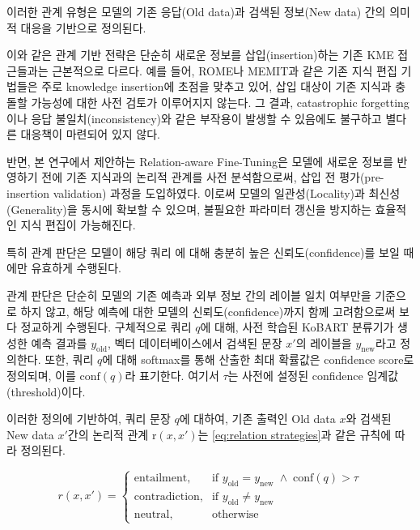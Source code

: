 \documentclass[a4paper,fleqn]{cas-sc}
\begin{document}
이러한 관계 유형은 모델의 기존 응답(Old data)과 검색된 정보(New data) 간의 의미적 대응을 기반으로 정의된다.

이와 같은 관계 기반 전략은 단순히 새로운 정보를 삽입(insertion)하는 기존 KME 접근들과는 근본적으로 다르다. 예를 들어, ROME나 MEMIT과 같은 기존 지식 편집 기법들은 주로 knowledge insertion에 초점을 맞추고 있어, 삽입 대상이 기존 지식과 충돌할 가능성에 대한 사전 검토가 이루어지지 않는다. 그 결과, catastrophic forgetting이나 응답 불일치(inconsistency)와 같은 부작용이 발생할 수 있음에도 불구하고 별다른 대응책이 마련되어 있지 않다.

반면, 본 연구에서 제안하는 Relation-aware Fine-Tuning은 모델에 새로운 정보를 반영하기 전에 기존 지식과의 논리적 관계를 사전 분석함으로써, 삽입 전 평가(pre-insertion validation) 과정을 도입하였다. 이로써 모델의 일관성(Locality)과 최신성(Generality)을 동시에 확보할 수 있으며, 불필요한 파라미터 갱신을 방지하는 효율적인 지식 편집이 가능해진다.

특히 관계 판단은 모델이 해당 쿼리 에 대해 충분히 높은 신뢰도(confidence)를 보일 때에만 유효하게 수행된다.

관계 판단은 단순히 모델의 기존 예측과 외부 정보 간의 레이블 일치 여부만을 기준으로 하지 않고, 해당 예측에 대한 모델의 신뢰도(confidence)까지 함께 고려함으로써 보다 정교하게 수행된다. 
구체적으로 쿼리 \( q \)에 대해, 사전 학습된 KoBART 분류기가 생성한 예측 결과를 \( y_{\text{old}} \), 벡터 데이터베이스에서 검색된 문장 \( x' \)의 레이블을 \( y_{\text{new}} \)라고 정의한다. 또한, 쿼리 \( q \)에 대해 softmax를 통해 산출한 최대 확률값은 confidence score로 정의되며, 이를 \( \mathrm{conf}(q) \)라 표기한다.
여기서 \( \tau \)는 사전에 설정된 confidence 임계값(threshold)이다.  

이러한 정의에 기반하여, 쿼리 문장 \( q \)에 대하여, 기존 출력인 Old data \( x \)와 검색된 New data \( x' \)간의 논리적 관계 \( \mathrm{r}(x,x') \)는 \cref{eq:relation strategies}과 같은 규칙에 따라 정의된다. 

\begin{equation}
    r(x, x') =
    \begin{cases}
    \text{entailment}, & \text{if } y_{\text{old}} = y_{\text{new}} \;\land\; \mathrm{conf}(q) > \tau \\
    \text{contradiction}, & \text{if } y_{\text{old}} \ne y_{\text{new}} \ \\
    \text{neutral}, & \text{otherwise}
    \end{cases}
    \label{eq:relation strategies}
    \end{equation}
\end{document}
